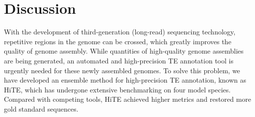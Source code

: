 \documentclass{bmcart}
\begin{document}
%



\section*{Discussion}
With the development of third-generation (long-read) sequencing technology, repetitive regions in the genome can be crossed, which greatly improves the quality of genome assembly. While quantities of high-quality genome assemblies are being generated, an automated and high-precision TE annotation tool is urgently needed for these newly assembled genomes. To solve this problem, we have developed an ensemble method for high-precision TE annotation, known as HiTE, which has undergone extensive benchmarking on four model species. Compared with competing tools, HiTE achieved higher metrics and restored more gold standard sequences.
\end{document}
